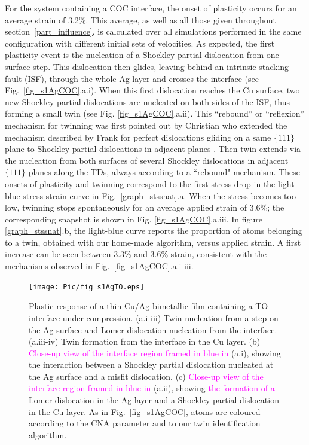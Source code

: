 \documentclass[final,3p,times,twocolumn]{elsarticle}
\begin{document}
For the system containing a COC interface, the onset of plasticity occurs for an average strain of 3.2\%. This average, as well as all those given throughout section~\ref{part_influence}, is calculated  over all simulations performed in the same configuration with different initial sets of velocities. As expected, the first plasticity event is the nucleation of a Shockley partial dislocation from one surface step. This dislocation then glides, leaving behind an intrinsic stacking fault (ISF), through the whole Ag layer and crosses the interface (see Fig.~\ref{fig_s1AgCOC}.a.i). When this first dislocation reaches the Cu surface, two new Shockley partial dislocations are nucleated on both sides of the ISF, thus forming a small twin (see Fig. \ref{fig_s1AgCOC}.a.ii). This ``rebound'' or ``reflexion'' mechanism for twinning was first pointed out by Christian who extended the mechanism described by Frank for perfect dislocations gliding on a same $\lbrace111\rbrace$ plane \cite{hirth82book} to Shockley partial dislocations in adjacent planes \cite{christian51PRS}. Then twin extends via the nucleation from both surfaces of several Shockley dislocations in adjacent $\lbrace111\rbrace$  planes along the TDs, always according to a ``rebound" mechanism. These onsets of plasticity and twinning correspond to the first stress drop in the light-blue stress-strain curve in Fig.~\ref{graph_stssnat}.a. When the stress becomes too low, twinning stops spontaneously for an average applied strain of 3.6\%; the corresponding snapshot is shown in Fig. \ref{fig_s1AgCOC}.a.iii. In figure \ref{graph_stssnat}.b, the light-blue curve reports the proportion of atoms belonging to a twin, obtained with our home-made algorithm, versus applied strain. A first increase can be seen between 3.3\% and 3.6\% strain, consistent with the mechanisms observed in Fig.~\ref{fig_s1AgCOC}.a.i-iii. 

\begin{figure}[!t]
	\begin{center}
		\texttt{[image: Pic/fig\_s1AgTO.eps]} 
	\end{center}
	\caption{Plastic response of a thin Cu/Ag bimetallic film containing a TO interface under compression. (a.i-iii) Twin nucleation from a step on the Ag surface and Lomer dislocation nucleation from the interface. (a.iii-iv) Twin formation from the interface in the Cu layer. (b) \textcolor{magenta}{Close-up view of the interface region framed in blue in} (a.i), showing the interaction between a Shockley partial dislocation nucleated at the Ag surface and a misfit dislocation. (c) \textcolor{magenta}{Close-up view of the interface region framed in blue in} (a.ii), showing \textcolor{magenta}{the formation of a} Lomer dislocation in the Ag layer and a Shockley partial dislocation in the Cu layer. As in Fig.~\ref{fig_s1AgCOC}, atoms are coloured according to the CNA parameter and to our twin identification algorithm.}\label{fig_s1AgTO}
\end{figure}
\end{document}

